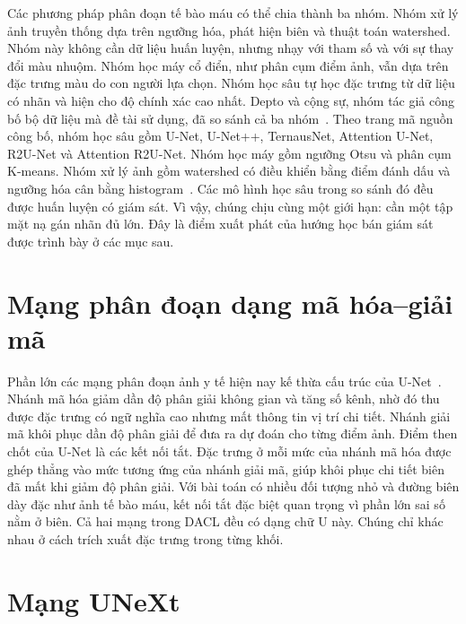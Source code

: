 Các phương pháp phân đoạn tế bào máu có thể chia thành ba nhóm. Nhóm xử lý ảnh truyền thống dựa trên ngưỡng hóa, phát hiện biên và thuật toán watershed. Nhóm này không cần dữ liệu huấn luyện, nhưng nhạy với tham số và với sự thay đổi màu nhuộm. Nhóm học máy cổ điển, như phân cụm điểm ảnh, vẫn dựa trên đặc trưng màu do con người lựa chọn. Nhóm học sâu tự học đặc trưng từ dữ liệu có nhãn và hiện cho độ chính xác cao nhất. Depto và cộng sự, nhóm tác giả công bố bộ dữ liệu mà đề tài sử dụng, đã so sánh cả ba nhóm~\cite{depto2021blood}. Theo trang mã nguồn công bố, nhóm học sâu gồm U-Net, U-Net++, TernausNet, Attention U-Net, R2U-Net và Attention R2U-Net. Nhóm học máy gồm ngưỡng Otsu và phân cụm K-means. Nhóm xử lý ảnh gồm watershed có điều khiển bằng điểm đánh dấu và ngưỡng hóa cân bằng histogram~\cite{depto2021repo}. Các mô hình học sâu trong so sánh đó đều được huấn luyện có giám sát. Vì vậy, chúng chịu cùng một giới hạn: cần một tập mặt nạ gán nhãn đủ lớn. Đây là điểm xuất phát của hướng học bán giám sát được trình bày ở các mục sau.

\section{Mạng phân đoạn dạng mã hóa--giải mã}
\label{sec:lit-unet}

Phần lớn các mạng phân đoạn ảnh y tế hiện nay kế thừa cấu trúc của U-Net~\cite{ronneberger2015unet}. Nhánh mã hóa giảm dần độ phân giải không gian và tăng số kênh, nhờ đó thu được đặc trưng có ngữ nghĩa cao nhưng mất thông tin vị trí chi tiết. Nhánh giải mã khôi phục dần độ phân giải để đưa ra dự đoán cho từng điểm ảnh. Điểm then chốt của U-Net là các kết nối tắt. Đặc trưng ở mỗi mức của nhánh mã hóa được ghép thẳng vào mức tương ứng của nhánh giải mã, giúp khôi phục chi tiết biên đã mất khi giảm độ phân giải. Với bài toán có nhiều đối tượng nhỏ và đường biên dày đặc như ảnh tế bào máu, kết nối tắt đặc biệt quan trọng vì phần lớn sai số nằm ở biên. Cả hai mạng trong DACL đều có dạng chữ U này. Chúng chỉ khác nhau ở cách trích xuất đặc trưng trong từng khối.

\section{Mạng UNeXt}
\label{sec:lit-unext}


